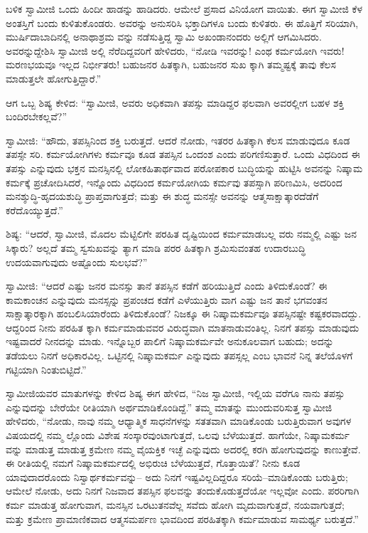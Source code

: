 ಬಳಿಕ ಸ್ವಾಮೀಜಿ ಒಂದು ಹಿಂದೀ ಹಾಡನ್ನು ಹಾಡಿದರು. ಆಮೇಲೆ ಪ್ರಸಾದ ವಿನಿಯೋಗ ವಾಯಿತು. ಈಗ ಸ್ವಾಮೀಜಿ ಕೆಳ ಅಂತಸ್ತಿಗೆ ಬಂದು ಕುಳಿತುಕೊಂಡರು. ಅವರನ್ನು ಅನುಸರಿಸಿ ಭಕ್ತಾದಿಗಳೂ ಬಂದು ಕುಳಿತರು. ಈ ಹೊತ್ತಿಗೆ ಸರಿಯಾಗಿ, ಮುರ್ಷಿದಾಬಾದಿನಲ್ಲಿ ಅನಾಥಾಶ್ರಮ ವನ್ನು ನಡೆಸುತ್ತಿದ್ದ ಸ್ವಾಮಿ ಅಖಂಡಾನಂದರು ಅಲ್ಲಿಗೆ ಆಗಮಿಸಿದರು. ಅವರನ್ನುದ್ದೇಶಿಸಿ ಸ್ವಾಮೀಜಿ ಅಲ್ಲಿ ನೆರೆದಿದ್ದವರಿಗೆ ಹೇಳಿದರು, “ನೋಡಿ ಇವರನ್ನು! ಎಂಥ ಕರ್ಮಯೋಗಿ ಇವರು! ಮರಣಭಯವೂ ಇಲ್ಲದ ನಿರ್ಭೀತರು! ಬಹುಜನರ ಹಿತಕ್ಕಾಗಿ, ಬಹುಜನರ ಸುಖ ಕ್ಕಾಗಿ ತಮ್ಮಷ್ಟಕ್ಕೆ ತಾವು ಕೆಲಸ ಮಾಡುತ್ತಲೇ ಹೋಗುತ್ತಿದ್ದಾರೆ.”

ಆಗ ಒಬ್ಬ ಶಿಷ್ಯ ಕೇಳಿದ: “ಸ್ವಾಮೀಜಿ, ಅವರು ಅಧಿಕವಾಗಿ ತಪಸ್ಸು ಮಾಡಿದ್ದರ ಫಲವಾಗಿ ಅವರಲ್ಲೀಗ ಬಹಳ ಶಕ್ತಿ ಬಂದಿರಬೇಕಲ್ಲವೆ?”

ಸ್ವಾಮೀಜಿ: “ಹೌದು, ತಪಸ್ಸಿನಿಂದ ಶಕ್ತಿ ಬರುತ್ತದೆ. ಆದರೆ ನೋಡು, ಇತರರ ಹಿತಕ್ಕಾಗಿ ಕೆಲಸ ಮಾಡುವುದೂ ಕೂಡ ತಪಸ್ಸೇ ಸರಿ. ಕರ್ಮಯೋಗಿಗಳು ಕರ್ಮವೂ ಕೂಡ ತಪಸ್ಸಿನ ಒಂದಂಶ ಎಂದು ಪರಿಗಣಿಸುತ್ತಾರೆ. ಒಂದು ವಿಧದಿಂದ ಈ ತಪಸ್ಸು ಎನ್ನುವುದು ಭಕ್ತನ ಮನಸ್ಸಿನಲ್ಲಿ ಲೋಕಹಿತಾರ್ಥವಾದ ಪರೋಪಕಾರ ಬುದ್ಧಿಯನ್ನು ಹುಟ್ಟಿಸಿ ಅವನನ್ನು ನಿಷ್ಕಾಮ ಕರ್ಮಕ್ಕೆ ಪ್ರಚೋದಿಸಿದರೆ, ಇನ್ನೊಂದು ವಿಧದಿಂದ ಕರ್ಮಯೋಗಿಯ ಕರ್ಮವು ತಪಸ್ಸಾಗಿ ಪರಿಣಮಿಸಿ, ಅದರಿಂದ ಮನಶ್ಶುದ್ಧಿ-ಹೃದಯಶುದ್ಧಿ ಪ್ರಾಪ್ತವಾಗುತ್ತದೆ; ಮತ್ತು ಈ ಶುದ್ಧ ಮನಸ್ಸೇ ಅವನನ್ನು ಆತ್ಮಸಾಕ್ಷಾತ್ಕಾರದೆಡೆಗೆ ಕರೆದೊಯ್ಯುತ್ತದೆ.”

ಶಿಷ್ಯ: “ಆದರೆ, ಸ್ವಾಮೀಜಿ, ಮೊದಲ ಮೆಟ್ಟಿಲಿಗೇ ಪರಹಿತ ದೃಷ್ಟಿಯಿಂದ ಕರ್ಮಮಾಡಬಲ್ಲ ವರು ನಮ್ಮಲ್ಲಿ ಎಷ್ಟು ಜನ ಸಿಕ್ಕಾರು? ಅಲ್ಲದೆ ತಮ್ಮ ಸ್ವಸುಖವನ್ನು ತ್ಯಾಗ ಮಾಡಿ ಪರರ ಹಿತಕ್ಕಾಗಿ ಶ್ರಮಿಸುವಂತಹ ಉದಾರಬುದ್ಧಿ ಉದಯವಾಗುವುದು ಅಷ್ಟೊಂದು ಸುಲಭವೆ?”

ಸ್ವಾಮೀಜಿ: “ಆದರೆ ಎಷ್ಟು ಜನರ ಮನಸ್ಸು ತಾನೆ ತಪಸ್ಸಿನ ಕಡೆಗೆ ಹರಿಯುತ್ತಿದೆ ಎಂದು ತಿಳಿದುಕೊಂಡೆ? ಈ ಕಾಮಕಾಂಚನ ಎನ್ನುವುದು ಮನಸ್ಸನ್ನು ಪ್ರಪಂಚದ ಕಡೆಗೆ ಎಳೆಯುತ್ತಿರು ವಾಗ ಎಷ್ಟು ಜನ ತಾನೆ ಭಗವಂತನ ಸಾಕ್ಷಾತ್ಕಾರಕ್ಕಾಗಿ ಹಂಬಲಿಸಿಯಾರೆಂದು ತಿಳಿದುಕೊಂಡೆ? ನಿಜಕ್ಕೂ ಈ ನಿಷ್ಕಾಮಕರ್ಮವೂ ತಪಸ್ಸಿನಷ್ಟೇ ಕಷ್ಟಕರವಾದದ್ದು. ಆದ್ದರಿಂದ ನೀನು ಪರಹಿತ ಕ್ಕಾಗಿ ಕರ್ಮಮಾಡುವವರ ವಿರುದ್ಧವಾಗಿ ಮಾತನಾಡುವಂತಿಲ್ಲ. ನಿನಗೆ ತಪಸ್ಸು ಮಾಡುವುದು ಇಷ್ಟವಾದರೆ ನೀನದನ್ನು ಮಾಡು. ಇನ್ನೊಬ್ಬರ ಪಾಲಿಗೆ ನಿಷ್ಕಾಮಕರ್ಮವೇ ಅನುಕೂಲವಾಗ ಬಹುದು; ಅದನ್ನು ತಡೆಯಲು ನಿನಗೆ ಅಧಿಕಾರವಿಲ್ಲ. ಒಟ್ಟಿನಲ್ಲಿ ನಿಷ್ಕಾಮಕರ್ಮ ಎನ್ನುವುದು ತಪಸ್ಸಲ್ಲ ಎಂಬ ಭಾವನೆ ನಿನ್ನ ತಲೆಯೊಳಗೆ ಗಟ್ಟಿಯಾಗಿ ನಿಂತುಬಿಟ್ಟಿದೆ.”

ಸ್ವಾಮೀಜಿಯವರ ಮಾತುಗಳನ್ನು ಕೇಳಿದ ಶಿಷ್ಯ ಈಗ ಹೇಳಿದ, “ನಿಜ ಸ್ವಾಮೀಜಿ, ಇಲ್ಲಿಯ ವರೆಗೂ ನಾನು ತಪಸ್ಸು ಎನ್ನುವುದನ್ನು ಬೇರೆಯೇ ರೀತಿಯಾಗಿ ಅರ್ಥಮಾಡಿಕೊಂಡಿದ್ದೆ.” ತಮ್ಮ ಮಾತನ್ನು ಮುಂದುವರಿಸುತ್ತ ಸ್ವಾಮೀಜಿ ಹೇಳಿದರು, “ನೋಡು, ನಾವು ನಮ್ಮ ಆಧ್ಯಾತ್ಮಿಕ ಸಾಧನೆಗಳನ್ನು ಸತತವಾಗಿ ಮಾಡಿಕೊಂಡು ಬರುತ್ತಿರುವಾಗ ಅವುಗಳ ವಿಷಯದಲ್ಲಿ ನಮ್ಮ ಲ್ಲೊಂದು ವಿಶೇಷ ಸಂಸ್ಕಾರವುಂಟಾಗುತ್ತದೆ, ಒಲವು ಬೆಳೆಯುತ್ತದೆ. ಹಾಗೆಯೇ, ನಿಷ್ಕಾಮಕರ್ಮ ವನ್ನು ಮಾಡುತ್ತ ಮಾಡುತ್ತ ಕ್ರಮೇಣ ನಮ್ಮ ವೈಯಕ್ತಿಕ ಇಚ್ಛೆ ಎನ್ನುವುದು ಅದರಲ್ಲಿ ಕರಗಿ ಹೋಗುವುದನ್ನು ಕಾಣುತ್ತೇವೆ. ಈ ರೀತಿಯಲ್ಲಿ ನಮಗೆ ನಿಷ್ಕಾಮಕರ್ಮದಲ್ಲಿ ಅಭಿರುಚಿ ಬೆಳೆಯುತ್ತದೆ, ಗೊತ್ತಾಯಿತೆ? ನೀನು ಕೂಡ ಯಾವುದಾದರೊಂದು ನಿಸ್ವಾರ್ಥಕರ್ಮವನ್ನು– ಅದು ನಿನಗೆ ಇಷ್ಟವಿಲ್ಲದಿದ್ದರೂ ಸರಿಯೆ–ಮಾಡಿಕೊಂಡು ಬರುತ್ತಿರು; ಆಮೇಲೆ ನೋಡು, ಅದು ನಿನಗೆ ನಿಜವಾದ ತಪಸ್ಸಿನ ಫಲವನ್ನು ತಂದುಕೊಡುತ್ತದೆಯೋ ಇಲ್ಲವೋ ಎಂದು. ಪರರಿಗಾಗಿ ಕರ್ಮ ಮಾಡುತ್ತ ಹೋಗುವಾಗ, ಮನಸ್ಸಿನ ಒರಟುತನವೆಲ್ಲ ಸವೆದು ಹೋಗಿ ಮೃದುವಾಗುತ್ತದೆ, ನಯವಾಗುತ್ತದೆ; ಮತ್ತು ಕ್ರಮೇಣ ಪ್ರಾಮಾಣಿಕವಾದ ಆತ್ಮಸಮರ್ಪಣ ಭಾವದಿಂದ ಪರಹಿತಕ್ಕಾಗಿ ಕರ್ಮಮಾಡುವ ಸಾಮರ್ಥ್ಯ ಬರುತ್ತದೆ.”


